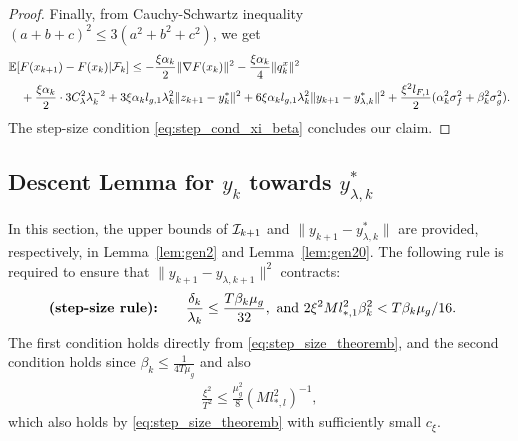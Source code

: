 \begin{proof}
Finally, from Cauchy-Schwartz inequality $(a+b+c)^2 \le 3 (a^2 + b^2 + c^2)$, we get
\begin{align}
    &\mathbb{E}[ F(x_{k+1}) - F(x_k) |\mathcal{F}_k] \le -\frac{\xi \alpha_k}{2} \|\nabla F(x_k)\|^2 - \frac{\xi \alpha_k}{4} \|q_k^x\|^2 \\
    &\quad + \frac{\xi \alpha_k}{2} \cdot 3 C_\lambda^2 \lambda_k^{-2} + 3 \xi \alpha_k l_{g,1}  \lambda_k^2 \|z_{k+1} - y_k^*\|^2 + 6 \xi  \alpha_k l_{g,1} \lambda_k^2 \|y_{k+1} - y_{\lambda, k}^*\|^2  + \frac{\xi^2 l_{F,1}}{2} (\alpha_k^2 \sigma_f^2 + \beta_k^2 \sigma_g^2). \nonumber
\end{align}
The step-size condition \eqref{eq:step_cond_xi_beta} concludes our claim.
\end{proof}

















\subsection{Descent Lemma for $y_k$ towards $y_{\lambda,k}^*$}

In this section, the upper bounds of $\mathcal{I}_{k+1}$ and $\|y_{k+1} - y_{\lambda, k}^*\|$ are provided, respectively, in Lemma~\ref{lem:gen2} and Lemma~\ref{lem:gen20}. The following rule is required to ensure that $\|y_{k+1} - y_{\lambda,k+1}\|^2$ contracts:
\begin{align}
    \textbf{(step-size rule):} \qquad & \frac{\delta_k}{\lambda_k} \le \frac{T \beta_k \mu_g}{32}, \hbox{ and } 2\xi^2 Ml_{*,1}^2 \beta_k^2 < T \beta_k \mu_g / 16. \label{eq:step_cond_beta_y_lambda}
\end{align}
The first condition holds directly from \eqref{eq:step_size_theoremb}, and the second condition holds since $\beta_k \le \frac{1}{4T\mu_g}$ and also
\begin{align*}
    \frac{\xi^2}{T^2} \le \frac{\mu_g^2}{8} (M l_{*,l}^2)^{-1},
\end{align*}
which also holds by \eqref{eq:step_size_theoremb} with sufficiently small $c_\xi$.


